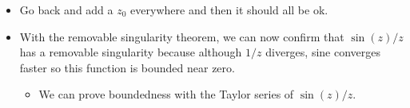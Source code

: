\documentclass[../notes.tex]{subfiles}
\begin{document}
\begin{itemize}
\begin{proof}
        Morera then tells us that $F\in\mO(U)$, so $F'=f\in\mO(U)$. Note that $F'=f$ because
        \begin{equation*}
            F'(z) = \lim_{\zeta\to z}\frac{F(\zeta)-F(z)}{\zeta-z}
            = \lim_{\zeta\to z}\frac{f(\zeta)(\zeta-z)-0}{\zeta-z}
            = \lim_{\zeta\to z}f(\zeta)
            = f(z)
        \end{equation*}
    \end{proof}
    \item Go back and add a $z_0$ everywhere and then it should all be ok.
    \item With the removable singularity theorem, we can now confirm that $\sin(z)/z$ has a removable singularity because although $1/z$ diverges, sine converges faster so this function is bounded near zero.
    \begin{itemize}
        \item We can prove boundedness with the Taylor series of $\sin(z)/z$.
    \end{itemize}
\end{itemize}
\end{document}
